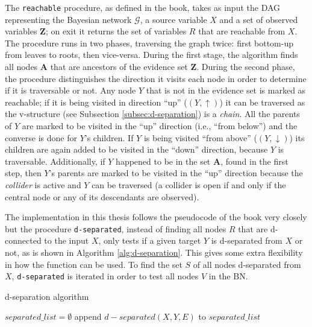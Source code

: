 The \texttt{reachable} procedure, as defined in the book, takes as input the DAG representing the Bayesian network $\mathcal{G}$, a source variable $X$ and a set of observed variables $\boldsymbol{Z}$; on exit it returns the set of variables $R$ that are reachable from $X$.
The procedure runs in two phases, traversing the graph twice: first bottom-up from leaves to roots, then vice-versa.
During the first stage, the algorithm finds all nodes $\boldsymbol{A}$ that are ancestors of the evidence set $\boldsymbol{Z}$.
During the second phase, the procedure distinguishes the direction it visits each node in order to determine if it is traversable or not.
Any node $Y$ that is not in the evidence set is marked as reachable; if it is being visited in direction \enquote{up} ($(Y,\uparrow)$) it can be traversed as the v-structure (see Subsection \ref{subsec:d-separation}) is a \textit{chain}.
All the parents of $Y$ are marked to be visited in the \enquote{up} direction (i.e., \enquote{from below}) and the converse is done for $Y$'s children.
If $Y$ is being visited \enquote{from above} ($(Y,\downarrow)$) its children are again added to be visited in the \enquote{down} direction, because $Y$ is traversable.
Additionally, if $Y$ happened to be in the set $\boldsymbol{A}$, found in the first step, then $Y$'s parents are marked to be visited in the \enquote{up} direction because the \textit{collider} is active and $Y$ can be traversed (a collider is open if and only if the central node or any of its descendants are observed).

The implementation in this thesis follows the pseudocode of the book very closely but the procedure \texttt{d-separated}, instead of finding all nodes $R$ that are d-connected to the input $X$, only tests if a given target $Y$ is d-separated from $X$ or not, as is shown in Algorithm \ref{alg:d-separation}.
This gives some extra flexibility in how the function can be used.
To find the set $S$ of all nodes d-separated from $X$, \texttt{d-separated} is iterated in order to test all nodes $V$ in the BN.

\begin{algorithm}[htp!]
	\caption{d-separation algorithm}
	\label{alg:d-separation}
	\begin{algorithmic}[1]
		\State $separated\_list = \emptyset$
			\State append $d-separated(X, Y, E)$ to $separated\_list$ 
		\EndFor
	\end{algorithmic}
\end{algorithm}

